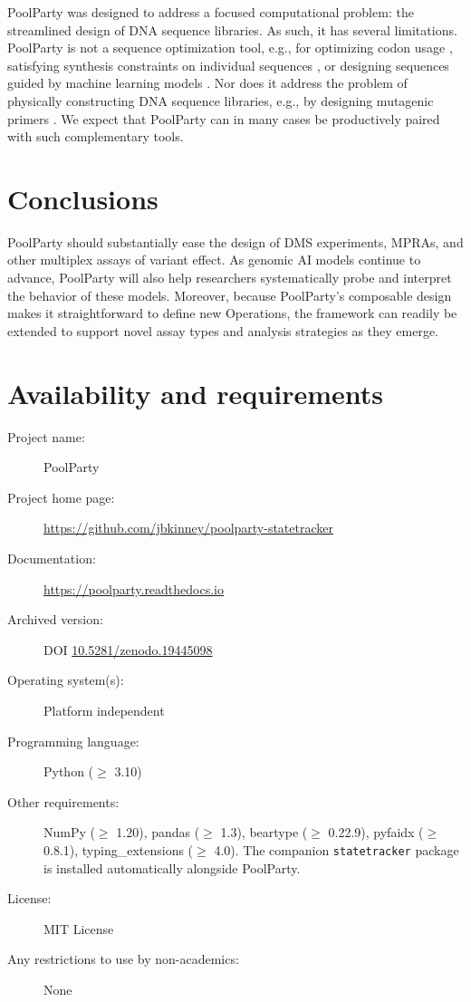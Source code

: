 \documentclass[pdflatex,sn-vancouver-num,referee,oneside]{sn-jnl}
\begin{document}
PoolParty was designed to address a focused computational problem: the streamlined design of DNA sequence libraries. As such, it has several limitations. PoolParty is not a sequence optimization tool, e.g., for optimizing codon usage \citep{Swainston2017rb}, satisfying synthesis constraints on individual sequences \citep{Zulkower2020jk}, or designing sequences guided by machine learning models \citep{Schreiber2025ledidi}. Nor does it address the problem of physically constructing DNA sequence libraries, e.g., by designing mutagenic primers \citep{Hiraga2021yg}. We expect that PoolParty can in many cases be productively paired with such complementary tools.

\section{Conclusions}\label{sec:conclusions}

PoolParty should substantially ease the design of DMS experiments, MPRAs, and other multiplex assays of variant effect. As genomic AI models continue to advance, PoolParty will also help researchers systematically probe and interpret the behavior of these models. Moreover, because PoolParty's composable design makes it straightforward to define new Operations, the framework can readily be extended to support novel assay types and analysis strategies as they emerge.

\backmatter

\section*{Availability and requirements}
\begin{description}
  \item[Project name:] PoolParty
  \item[Project home page:] \url{https://github.com/jbkinney/poolparty-statetracker}
  \item[Documentation:] \url{https://poolparty.readthedocs.io}
  \item[Archived version:] DOI \href{https://doi.org/10.5281/zenodo.19445098}{10.5281/zenodo.19445098}
  \item[Operating system(s):] Platform independent
  \item[Programming language:] Python ($\geq$ 3.10)
  \item[Other requirements:] NumPy ($\geq$ 1.20), pandas ($\geq$ 1.3), beartype ($\geq$ 0.22.9), pyfaidx ($\geq$ 0.8.1), typing\_extensions ($\geq$ 4.0). The companion \texttt{statetracker} package is installed automatically alongside PoolParty.
  \item[License:] MIT License
  \item[Any restrictions to use by non-academics:] None
\end{description}
\end{document}
